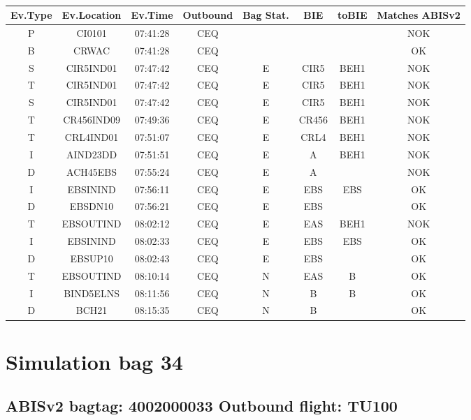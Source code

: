 \documentclass{report}
\begin{document}
\paragraph{}
\begin{longtable}{cccccccc}    \toprule
\rowcolor{white!50}
\textbf{Ev.Type} & \textbf{Ev.Location} & \textbf{Ev.Time} & \textbf{Outbound} & \textbf{Bag Stat.} & \textbf{BIE} & \textbf{toBIE} & \textbf{Matches ABISv2} \\\midrule
P & CI0101 & 07:41:28  & CEQ &  &  &  & NOK\\
B & CRWAC & 07:41:28  & CEQ &  &  &  & OK\\
S & CIR5IND01 & 07:47:42  & CEQ & E & CIR5 & BEH1 & NOK\\
T & CIR5IND01 & 07:47:42  & CEQ & E & CIR5 & BEH1 & NOK\\
S & CIR5IND01 & 07:47:42  & CEQ & E & CIR5 & BEH1 & NOK\\
T & CR456IND09 & 07:49:36  & CEQ & E & CR456 & BEH1 & NOK\\
T & CRL4IND01 & 07:51:07  & CEQ & E & CRL4 & BEH1 & NOK\\
I & AIND23DD & 07:51:51  & CEQ & E & A & BEH1 & NOK\\
D & ACH45EBS & 07:55:24  & CEQ & E & A &  & NOK\\
I & EBSININD & 07:56:11  & CEQ & E & EBS & EBS & OK\\
D & EBSDN10 & 07:56:21  & CEQ & E & EBS &  & OK\\
T & EBSOUTIND & 08:02:12  & CEQ & E & EAS & BEH1 & NOK\\
I & EBSININD & 08:02:33  & CEQ & E & EBS & EBS & OK\\
D & EBSUP10 & 08:02:43  & CEQ & E & EBS &  & OK\\
T & EBSOUTIND & 08:10:14  & CEQ & N & EAS & B & OK\\
I & BIND5ELNS & 08:11:56  & CEQ & N & B & B & OK\\
D & BCH21 & 08:15:35  & CEQ & N & B &  & OK\\
\bottomrule
\end{longtable}
\pagebreak
\section*{Simulation bag 34}
\subsection*{ABISv2 bagtag: 4002000033 Outbound flight: TU100}
\end{document}
